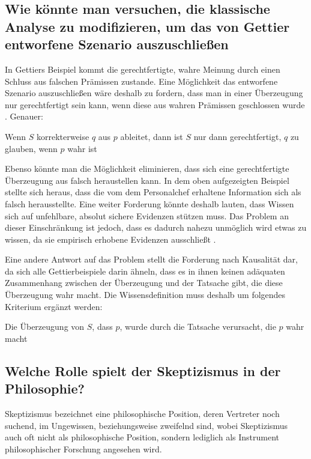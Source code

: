 \documentclass[a4paper]{article}
\begin{document}
\subsection{Wie könnte man versuchen, die klassische Analyse zu modifizieren, um das von Gettier entworfene Szenario auszuschließen}
In Gettiers Beispiel kommt die gerechtfertigte, wahre Meinung durch einen Schluss aus falschen Prämissen zustande. Eine Möglichkeit das entworfene Szenario auszuschließen wäre deshalb zu fordern, dass man in einer Überzeugung nur gerechtfertigt sein kann, wenn diese aus wahren Prämissen geschlossen wurde \cite{gettier1}. Genauer:
\begin{center}
    Wenn $S$ korrekterweise $q$ aus $p$ ableitet, dann ist $S$ nur dann gerechtfertigt, $q$ zu glauben, wenn $p$ wahr ist
\end{center}
Ebenso könnte man die Möglichkeit eliminieren, dass sich eine gerechtfertigte Überzeugung aus falsch heraustellen kann. In dem oben aufgezeigten Beispiel stellte sich heraus, dass die vom dem Personalchef erhaltene Information sich als falsch herausstellte. Eine weiter Forderung könnte deshalb lauten, dass Wissen sich auf unfehlbare, absolut sichere Evidenzen stützen muss. Das Problem an dieser Einschränkung ist jedoch, dass es dadurch nahezu unmöglich wird etwas zu wissen, da sie empirisch erhobene Evidenzen ausschließt \cite{gettier2}.

Eine andere Antwort auf das Problem stellt die Forderung nach Kausalität dar, da sich alle Gettierbeispiele darin ähneln, dass es in ihnen keinen adäquaten Zusammenhang zwischen der Überzeugung und der Tatsache gibt, die diese Überzeugung wahr macht. Die Wissensdefinition muss deshalb um folgendes Kriterium ergänzt werden:

\begin{center}
    Die Überzeugung von $S$, dass $p$, wurde durch die Tatsache verursacht, die $p$ wahr macht \cite{gettier1}
\end{center}

\setcounter{section}{4}
\setcounter{subsection}{0}
\subsection{Welche Rolle spielt der Skeptizismus in der Philosophie?}
Skeptizismus bezeichnet eine philosophische Position, deren Vertreter noch suchend, im Ungewissen, beziehungsweise zweifelnd sind, wobei Skeptizismus auch oft nicht als philosophische Position, sondern lediglich als Instrument philosophischer Forschung angesehen wird. 
\end{document}
